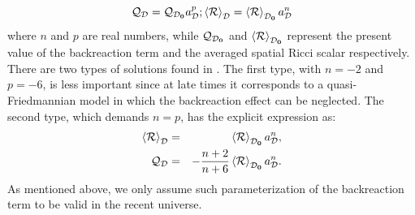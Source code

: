 \documentclass[preprint,preprintnumbers, prd, floatfix,  superscriptaddress,nofootinbib] {revtex4-1}
\newcommand{\CD}{{\cal D}}
\newcommand{\CR}{{\cal R}}
\newcommand{\average}[1]{\left\langle #1 \right\rangle_\CD}
\newcommand{\naverage}[1]{\left\langle #1 \right\rangle_{\CD_{\rm \bf 0}}}
\newcommand{\now}[1]{{#1_{\rm \bf 0}}}
\begin{document}
\begin{equation}
{\cal Q}_{\CD}={\cal Q}_{\now\CD}a_{\CD}^{p};
\average{\CR}=\naverage{\CR}a_{\CD}^{n}
\end{equation}
where $n$ and $p$ are real numbers, while ${\cal Q}_{\now\CD}$ and $\naverage{\CR}$ represent the present value of the backreaction term and the averaged spatial Ricci scalar respectively. There are two types of solutions found in \cite{buchert2006correspondence}. The first type, with $n=-2$ and $p=-6$, is less important since at late times it corresponds to a quasi-Friedmannian model in which the backreaction effect can be neglected. The second type, which demands $n=p$, has the
explicit expression as:
\begin{eqnarray}
\average{\CR}&=&\naverage{\CR}a_{\CD}^{n} ,\\
{\cal Q}_{\CD}&=&-\frac{n+2}{n+6}\naverage{\CR}a_{\CD}^{n}.
\end{eqnarray}
As mentioned above, we only assume such parameterization of the backreaction term to be valid in the recent universe.
\end{document}
